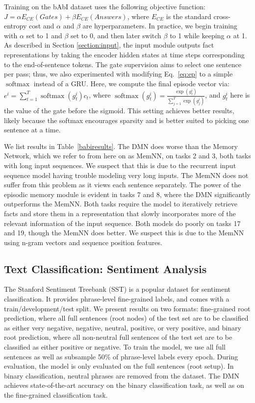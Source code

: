 \documentclass{article}
\DeclareMathOperator*{\softmax}{softmax}
\begin{document}
Training on the bAbI dataset uses the following objective function: $J = \alpha E_{CE}(Gates) + \beta E_{CE}(Answers)$, where $E_{CE}$ is the standard cross-entropy cost and $\alpha$ and $\beta$ are hyperparameters. In practice, we begin training with $\alpha$ set to 1 and $\beta$ set to 0, and then later switch $\beta$ to 1 while keeping $\alpha$ at 1. As described in Section \ref{section:input}, the input module outputs fact representations by taking the encoder hidden states at time steps corresponding to the end-of-sentence tokens. The gate supervision aims to select one sentence per pass; thus, we also experimented with modifying Eq.~\ref{eq:ep} to a simple $\softmax$ instead of a GRU. Here, we compute the final episode vector via:
$e^i = \sum_{t=1}^{T} \softmax(g^{i}_t)c_t$, 
where $\softmax(g^{i}_t) = \frac{\exp(g^{i}_t)}{\sum_{j=1}^T \exp(g^{i}_j)}$, and $g^{i}_t$ here is the value of the gate before the sigmoid. This setting achieves better results, likely because the softmax encourages sparsity and is better suited to picking one sentence at a time.


We list results in Table~\ref{babiresults}. The DMN does worse than the Memory Network, which we refer to from here on as MemNN, on tasks 2 and 3, both tasks with long input sequences.  
We suspect that this is due to the recurrent input sequence model having trouble modeling very long inputs. The MemNN does not suffer from this problem as it views each sentence separately. 
The power of the episodic memory module is evident in tasks 7 and 8, where the DMN significantly outperforms the MemNN. Both tasks require the model to iteratively retrieve facts and store them in a representation that slowly incorporates more of the relevant information of the input sequence. 
Both models do poorly on tasks 17 and 19, though the MemNN does better. We suspect this is due to the MemNN using n-gram vectors and sequence position features.

\subsection{Text Classification: Sentiment Analysis}
The Stanford Sentiment Treebank (SST) \cite{Socher2013EMNLP} is a popular dataset for sentiment classification. It provides phrase-level fine-grained labels, and comes with a train/development/test split. We present results on two formats: fine-grained root prediction, where all full sentences (root nodes) of the test set are to be classified as either very negative, negative, neutral, positive, or very positive, and binary root prediction, where all non-neutral full sentences of the test set are to be classified as either positive or negative.
To train the model, we use all full sentences as well as subsample 50\% of phrase-level labels every epoch. During evaluation, the model is only evaluated on the full sentences (root setup). In binary classification, neutral phrases are removed from the dataset. The DMN achieves state-of-the-art accuracy on the binary classification task, as well as on the fine-grained classification task.
\end{document}
